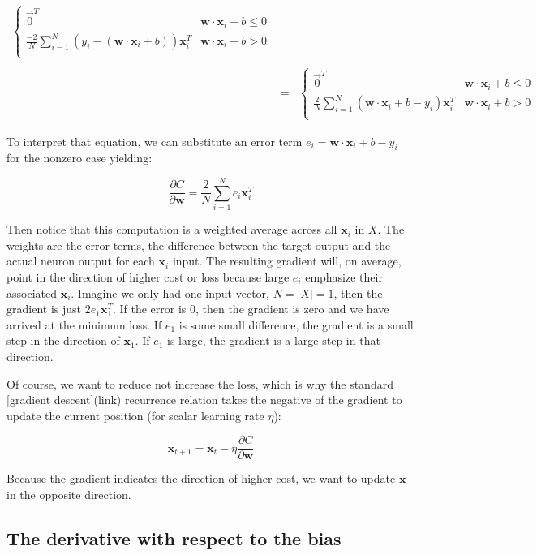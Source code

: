 \documentclass[11pt]{article}
\begin{document}
\begin{eqnarray*}
\begin{cases}
	\vec{0}^T & \mathbf{w} \cdot \mathbf{x}_i + b \leq 0\\
	\frac{-2}{N} \sum_{i=1}^N (y_i-(\mathbf{w}\cdot\mathbf{x}_i+b))\mathbf{x}_i^T & \mathbf{w} \cdot \mathbf{x}_i + b > 0\\
\end{cases}\\\\
 & = & \begin{cases}
	\vec{0}^T & \mathbf{w} \cdot \mathbf{x}_i + b \leq 0\\
	\frac{2}{N} \sum_{i=1}^N (\mathbf{w}\cdot\mathbf{x}_i+b-y_i)\mathbf{x}_i^T & \mathbf{w} \cdot \mathbf{x}_i + b > 0\\
\end{cases}
\end{eqnarray*}

To interpret that equation, we can substitute an error term $e_i = \mathbf{w}\cdot\mathbf{x}_i+b-y_i$ for the nonzero case yielding:

\[
\frac{\partial C}{\partial \mathbf{w}} = \frac{2}{N} \sum_{i=1}^N e_i\mathbf{x}_i^T
\]

Then notice that this computation is a weighted average across all $\mathbf{x}_i$ in $X$. The weights are the error terms, the difference between the target output and the actual neuron output for each $\mathbf{x}_i$ input. The resulting gradient will, on average, point in the direction of higher cost or loss because large $e_i$ emphasize their associated $\mathbf{x}_i$. Imagine we only had one input vector, $N=|X|=1$, then the gradient is just $2e_1\mathbf{x}_1^T$.  If the error is 0, then the gradient is zero and we have arrived at the minimum loss. If $e_1$ is some small difference, the gradient is a small step in the direction of $\mathbf{x}_1$. If $e_1$ is large, the gradient is a large step in that direction.

Of course, we want to reduce not increase the loss, which is why the standard [gradient descent](link) recurrence relation takes the negative of the gradient to update the current position (for scalar learning rate  $\eta$):

\[
\mathbf{x}_{t+1} = \mathbf{x}_{t} - \eta \frac{\partial C}{\partial \mathbf{w}}
\]

Because the gradient indicates the direction of higher cost, we want to update $\mathbf{x}$ in the opposite direction.

\subsection{The derivative with respect to the bias}
\end{document}
